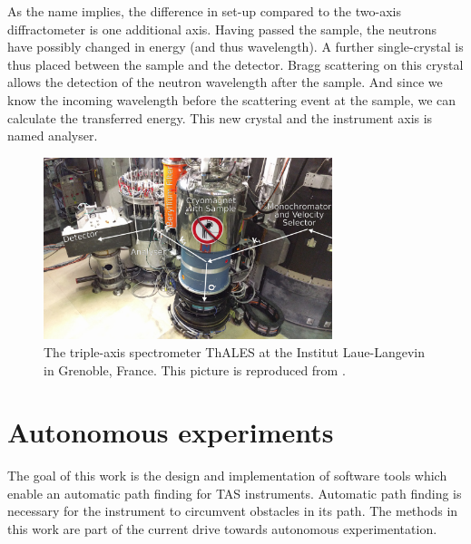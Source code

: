 As the name implies, the difference in set-up compared to the two-axis diffractometer is one additional axis. Having passed the sample, the neutrons have possibly changed in energy (and thus wavelength). A further single-crystal is thus placed between the sample and the detector. Bragg scattering on this crystal allows the detection of the neutron wavelength after the sample. And since we know the incoming wavelength before the scattering event at the sample, we can calculate the transferred energy. This new crystal and the instrument axis is named analyser.


\clearpage
\begin{figure}[htb]
	\centering
	\includegraphics[width=0.75\textwidth]{figures/thales.jpg}
	\caption{The triple-axis spectrometer ThALES \cite{thales} at the Institut Laue-Langevin in Grenoble, France. This picture is reproduced from \cite{skxpaper}.}
	\label{fig:thales}
\end{figure}



\section{Autonomous experiments \label{sec:autonomous}}

The goal of this work is the design and implementation of software tools which enable an automatic path finding for TAS instruments.
Automatic path finding is necessary for the instrument to circumvent obstacles in its path. The methods in this work are part of the current drive towards autonomous experimentation.

